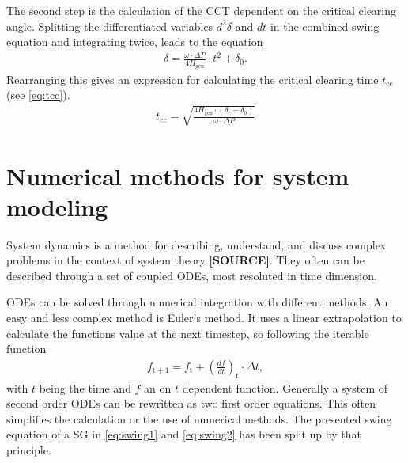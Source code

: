 The second step is the calculation of the \acs{CCT} dependent on the critical clearing angle. Splitting the differentiated variables $d^2\delta$ and $dt$ in the combined swing equation and integrating twice, leads to the equation
\begin{align}
        \delta=\frac{\omega \cdot \Delta P}{4 H_\mathrm{gen}} \cdot t^2 + \delta_\mathrm{0}. \nonumber
\end{align}
Rearranging this gives an expression for calculating the critical clearing time $t_\mathrm{cc}$ (see \autoref{eq:tcc}).
\begin{align}
        t_\mathrm{cc}=\sqrt{\frac{4 H_\mathrm{gen} \cdot (\delta_\mathrm{c}-\delta_\mathrm{0})}{\omega \cdot \Delta P}} \label{eq:tcc}
\end{align}

\section{Numerical methods for system modeling}

System dynamics is a method for describing, understand, and discuss complex problems in the context of system theory \textbf{[SOURCE]}. They often can be described through a set of coupled \acfp{ODE}, most resoluted in time dimension.  

\acsp{ODE} can be solved through numerical integration with different methods. An easy and less complex method is Euler's method. It uses a linear extrapolation to calculate the functions value at the next timestep, so following the iterable function
\begin{align}
        f_\mathrm{t+1}=f_\mathrm{t}+\left(\frac{df}{dt}\right)_\mathrm{t} \cdot \Delta t \label{eq:euler},
\end{align}
with $t$ being the time and $f$ an on $t$ dependent function. Generally a system of second order \acsp{ODE} can be rewritten as two first order equations. This often simplifies the calculation or the use of numerical methods. The presented swing equation of a \acs{SG} in \autoref{eq:swing1} and \autoref{eq:swing2} has been split up by that principle.  


